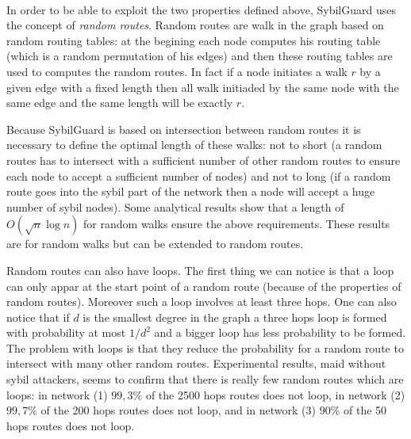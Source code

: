 \documentclass[a4paper,11pt]{article}
\begin{document}

\paragraph{}
In order to be able to exploit the two properties defined above, SybilGuard uses the concept of \emph{random routes}.
Random routes are walk in the graph based on random routing tables: at the begining each node computes his routing table (which is a random permutation of his edges) and then these routing tables are used to computes the random routes.
In fact if a node initiates a walk $r$ by a given edge with a fixed length then all walk initiaded by the same node with the same edge and the same length will be exactly $r$.

Because SybilGuard is based on intersection between random routes it is necessary to define the optimal length of these walks: not to short (a random routes has to intersect with a sufficient number of other random routes to ensure each node to accept a sufficient number of nodes) and not to long (if a random route goes into the sybil part of the network then a node will accept a huge number of sybil nodes).
Some analytical results show that a length of $O(\sqrt{n} \log n)$ for random walks ensure the above requirements. 
These results are for random walks but can be extended to random routes.

Random routes can also have loops.
The first thing we can notice is that a loop can only appar at the start point of a random route (because of the properties of random routes).
Moreover such a loop involves at least three hops.
One can also notice that if $d$ is the smallest degree in the graph a three hops loop is formed with probability at most $1/d^2$ and a bigger loop has less probability to be formed.
The problem with loops is that they reduce the probability for a random route to intersect with many other random routes. 
Experimental results, maid without sybil attackers, seems to confirm that there is really few random routes which are loops: in network (1) $99,3\%$ of the 2500 hops routes does not loop, in network (2) $99,7\%$ of the 200 hops routes does not loop, and in network (3) $90\%$ of the 50 hops routes does not loop.
\end{document}
